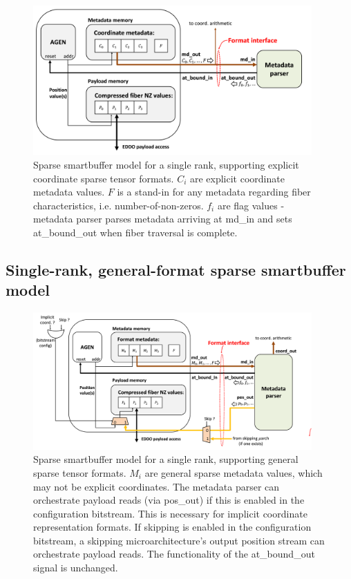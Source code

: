 \begin{figure}[ht]
    \centering
    \includegraphics[width=0.95\textwidth]{figures/single_rank_explicit_coordinate_smartbuffer_model.png}
    \caption{Sparse smartbuffer model for a single rank, supporting explicit coordinate sparse tensor formats. ${C_i}$ are explicit coordinate metadata values. $F$ is a stand-in for any metadata regarding fiber characteristics, i.e. number-of-non-zeros. ${f_i}$ are flag values - metadata parser parses metadata arriving at md\_in and sets at\_bound\_out when fiber traversal is complete.}
    \label{fig:single_rank_explicit_coordinate_smartbuffer_model}
\end{figure}

\subsection{Single-rank, general-format sparse smartbuffer model}

\begin{figure}[ht]
    \centering
    \includegraphics[width=0.95\textwidth]{figures/single_rank_general_format_smartbuffer_model.png}
    \caption{Sparse smartbuffer model for a single rank, supporting general sparse tensor formats. ${M_i}$ are general sparse metadata values, which may not be explicit coordinates. The metadata parser can orchestrate payload reads (via pos\_out) if this is enabled in the configuration bitstream. This is necessary for implicit coordinate representation formats. If skipping is enabled in the configuration bitstream, a skipping microarchitecture's output position stream can orchestrate payload reads. The functionality of the at\_bound\_out signal is unchanged. }
    \label{fig:single_rank_general_format_smartbuffer_model}
\end{figure}


